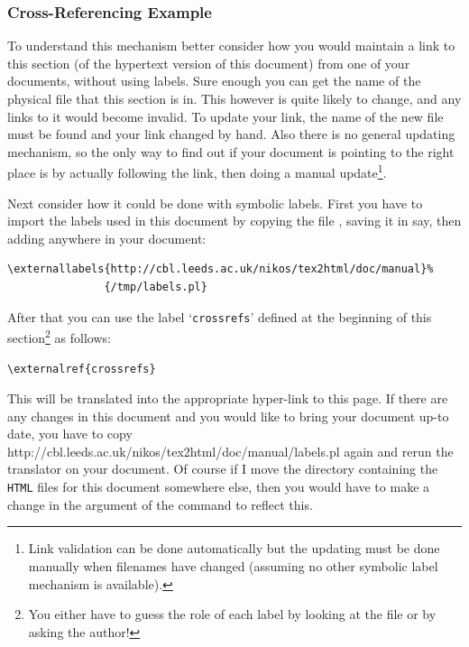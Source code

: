 

\subsubsection{Cross-Referencing Example\label{crossrefs}}%
To understand this mechanism better consider 
how you would maintain a link to this section  
(of the hypertext version of this document) from one of your documents,
without using labels.
Sure enough you can get the name of the physical file that this section is in. 
This however is quite likely to change, and any links to it would become invalid. 
%
To update your link, the name of the new file must be found 
and your link changed by hand. 
Also there is no general updating mechanism, so the only way to find
out if your document is pointing to the right place is by actually
following the link, then doing a manual update\footnote{%
Link validation can be done automatically but the updating must be done
manually when filenames have changed (assuming no other symbolic label
mechanism is available).}.

\html{\\}%
Next consider how it could be done with symbolic labels. 
First you have to import the labels used in this document 
by copying the file ,
saving it in  say,
then adding anywhere in your document:
\begin{small}
\begin{verbatim}
\externallabels{http://cbl.leeds.ac.uk/nikos/tex2html/doc/manual}%
               {/tmp/labels.pl}
\end{verbatim}
\end{small}
After that you can use the label `\texttt{crossrefs}' defined at the beginning of this 
section\footnote{You either have to guess the role of each label by
looking at the  file or by asking the author!} as follows:
\begin{small}
\begin{verbatim}
\externalref{crossrefs}
\end{verbatim}
\end{small}
This will be translated into the appropriate hyper-link to this page.
If there are any changes in this document and you would like to
bring your document up-to date, you have to copy 
%
{http://cbl.leeds.ac.uk/nikos/tex2html/doc/manual/labels.pl} again
and rerun the translator on your document. Of course if I move the 
directory containing the \texttt{HTML} files for this document somewhere else, 
then you would have to make a change in the argument of the 
 command to reflect this. 

